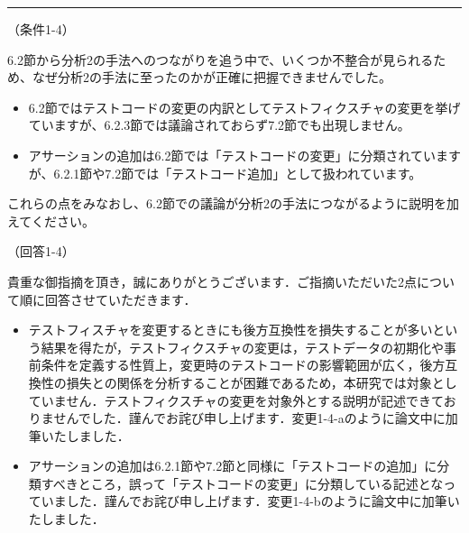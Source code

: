 \documentclass{jarticle} %
\def\subsection#1{ \vspace{1pc} {\gt #1} }
\def\nextans{ \vspace{2pc} \hrule }
\begin{document}
\newpage
\nextans
\subsection{（条件1-4）}

6.2節から分析2の手法へのつながりを追う中で、いくつか不整合が見られるため、なぜ分析2の手法に至ったのかが正確に把握できませんでした。
\begin{itemize}
\item 6.2節ではテストコードの変更の内訳としてテストフィクスチャの変更を挙げていますが、6.2.3節では議論されておらず7.2節でも出現しません。
\item アサーションの追加は6.2節では「テストコードの変更」に分類されていますが、6.2.1節や7.2節では「テストコード追加」として扱われています。
\end{itemize}
これらの点をみなおし、6.2節での議論が分析2の手法につながるように説明を加えてください。

\subsection{（回答1-4）}

貴重な御指摘を頂き，誠にありがとうございます．ご指摘いただいた2点について順に回答させていただきます．
\begin{itemize}
\item テストフィスチャを変更するときにも後方互換性を損失することが多いという結果を得たが，テストフィクスチャの変更は，テストデータの初期化や事前条件を定義する性質上，変更時のテストコードの影響範囲が広く，後方互換性の損失との関係を分析することが困難であるため，本研究では対象としていません．テストフィクスチャの変更を対象外とする説明が記述できておりませんでした．謹んでお詫び申し上げます．変更1-4-aのように論文中に加筆いたしました．
\item アサーションの追加は6.2.1節や7.2節と同様に「テストコードの追加」に分類すべきところ，誤って「テストコードの変更」に分類している記述となっていました．謹んでお詫び申し上げます．変更1-4-bのように論文中に加筆いたしました．
\end{itemize}
\end{document}
